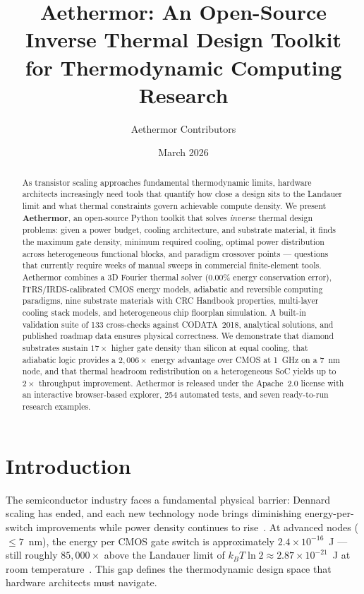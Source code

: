 \documentclass[11pt,twocolumn]{article}
\title{Aethermor: An Open-Source Inverse Thermal Design Toolkit \\
       for Thermodynamic Computing Research}
\author{Aethermor Contributors}
\date{March 2026}
\begin{document}
\maketitle

\begin{abstract}
As transistor scaling approaches fundamental thermodynamic limits,
hardware architects increasingly need tools that quantify how close a
design sits to the Landauer limit and what thermal constraints govern
achievable compute density. We present \textbf{Aethermor}, an
open-source Python toolkit that solves \emph{inverse} thermal design
problems: given a power budget, cooling architecture, and substrate
material, it finds the maximum gate density, minimum required cooling,
optimal power distribution across heterogeneous functional blocks, and
paradigm crossover points --- questions that currently require weeks of
manual sweeps in commercial finite-element tools. Aethermor combines a
3D Fourier thermal solver (0.00\% energy conservation error), ITRS/IRDS-calibrated CMOS
energy models, adiabatic and reversible computing paradigms, nine
substrate materials with CRC Handbook properties, multi-layer cooling
stack models, and heterogeneous chip floorplan simulation. A built-in
validation suite of 133 cross-checks against CODATA~2018, analytical
solutions, and published roadmap data ensures physical correctness. We
demonstrate that diamond substrates sustain $17\times$ higher gate
density than silicon at equal cooling, that adiabatic logic provides a
$2{,}006\times$ energy advantage over CMOS at 1~GHz on a 7~nm node,
and that thermal headroom redistribution on a heterogeneous SoC yields
up to $2\times$ throughput improvement. Aethermor is released under the
Apache~2.0 license with an interactive browser-based explorer, 254
automated tests, and seven ready-to-run research examples.
\end{abstract}

\section{Introduction}
\label{sec:intro}

The semiconductor industry faces a fundamental physical barrier:
Dennard scaling has ended, and each new technology node brings
diminishing energy-per-switch improvements while power density
continues to rise~\cite{dennard1974,esmaeilzadeh2011}. At advanced
nodes ($\leq 7$~nm), the energy per CMOS gate switch is approximately
$2.4 \times 10^{-16}$~J --- still roughly $85{,}000\times$ above the
Landauer limit of $k_B T \ln 2 \approx 2.87 \times 10^{-21}$~J at
room temperature~\cite{landauer1961}. This gap defines the
thermodynamic design space that hardware architects must navigate.
\end{document}
